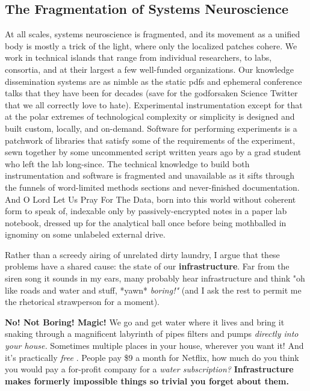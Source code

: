 \documentclass[nohyper]{tufte-book-jls}
\begin{document}
\hypertarget{the-fragmentation-of-systems-neuroscience}{%
\subsection{The Fragmentation of Systems
Neuroscience}\label{the-fragmentation-of-systems-neuroscience}}

At all scales, systems neuroscience is fragmented, and its movement as a
unified body is mostly a trick of the light, where only the localized
patches cohere. We work in technical islands that range from individual
researchers, to labs, consortia, and at their largest a few well-funded
organizations. Our knowledge dissemination systems are as nimble as the
static pdfs and ephemeral conference talks that they have been for
decades (save for the godforsaken Science Twitter that we all correctly
love to hate). Experimental instrumentation except for that at the polar
extremes of technological complexity or simplicity is designed and built
custom, locally, and on-demand. Software for performing experiments is a
patchwork of libraries that satisfy some of the requirements of the
experiment, sewn together by some uncommented script written years ago
by a grad student who left the lab long-since. The technical knowledge
to build both instrumentation and software is fragmented and unavailable
as it sifts through the funnels of word-limited methods sections and
never-finished documentation. And O Lord Let Us Pray For The Data, born
into this world without coherent form to speak of, indexable only by
passively-encrypted notes in a paper lab notebook, dressed up for the
analytical ball once before being mothballed in ignominy on some
unlabeled external drive.

Rather than a screedy airing of unrelated dirty laundry, I argue that
these problems have a shared cause: the state of our
\textbf{infrastructure}. Far from the siren song it sounds in my ears,
many probably hear infrastructure and think "oh like roads and water and
stuff, *yawn* \emph{boring!"} (and I ask the rest to permit me the
rhetorical strawperson for a moment).

\textbf{No! Not Boring! Magic!} We go and get water where it lives and
bring it snaking through a magnificent labyrinth of pipes filters and
pumps \emph{directly into your house.} Sometimes multiple places in your
house, wherever you want it! And it's practically
\emph{free} . People
pay \$9 a month for Netflix, how much do you think you would pay a
for-profit company for a \emph{water subscription?}
\textbf{Infrastructure makes formerly impossible things so trivial you
forget about them.}
\end{document}
